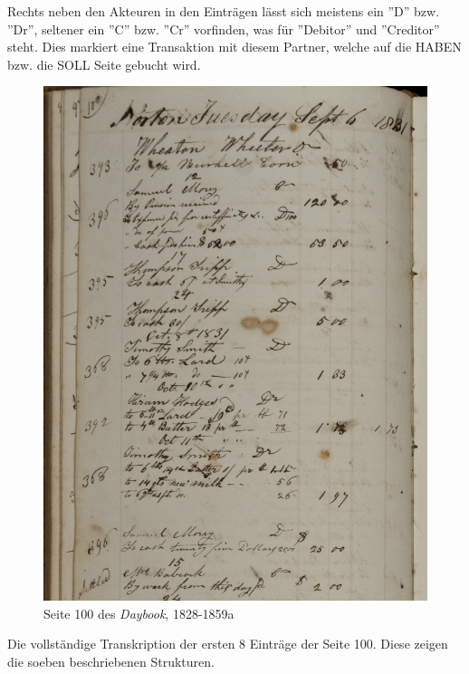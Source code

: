\documentclass[12pt,a4paper]{article}
\begin{document}
Rechts neben den Akteuren in den Einträgen lässt sich meistens ein ''D'' bzw. ''Dr'', seltener ein ''C'' bzw. ''Cr'' vorfinden, was für ''Debitor'' und ''Creditor'' steht. Dies markiert eine Transaktion mit diesem Partner, welche auf die HABEN bzw. die SOLL Seite gebucht wird.
\begin{figure}[H]
\centering
	\includegraphics[width=1\textwidth]{img/wheaton_100_101.jpg}  
    \caption[Seite 100 des \textit{Daybook, \protect\url{hdl.handle.net/11040/17982}}, 1828-1859]{Seite 100 des \textit{Daybook}, 1828-1859a} \label{fig:wheaton}
\end{figure}
Die vollständige Transkription der ersten 8 Einträge der Seite 100. Diese zeigen die soeben beschriebenen Strukturen.
\\
\\
\end{document}
